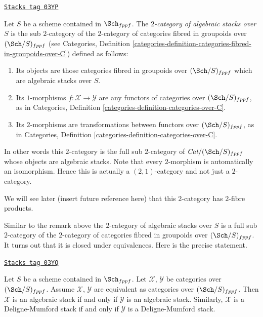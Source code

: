 \begin{definition}
\label{algebraic-definition-morphism-algebraic-stacks}
\href{https://stacks.math.columbia.edu/tag/03YP}{\texttt{Stacks tag 03YP}}

Let $S$ be a scheme contained in $\Sch_{fppf}$.
The {\it $2$-category of algebraic stacks over $S$} is the
sub $2$-category of the $2$-category of categories fibred in
groupoids over $(\Sch/S)_{fppf}$ (see
Categories,
Definition \ref{categories-definition-categories-fibred-in-groupoids-over-C})
defined as follows:
\begin{enumerate}
\item Its objects are those categories fibred in groupoids
over $(\Sch/S)_{fppf}$ which are algebraic stacks over $S$.
\item Its $1$-morphisms $f : \mathcal{X} \to \mathcal{Y}$ are
any functors of categories over $(\Sch/S)_{fppf}$, as in
Categories, Definition \ref{categories-definition-categories-over-C}.
\item Its $2$-morphisms are transformations between functors
over $(\Sch/S)_{fppf}$, as in
Categories, Definition \ref{categories-definition-categories-over-C}.
\end{enumerate}
\end{definition}

In other words this $2$-category is the full sub $2$-category of
$\textit{Cat}/(\Sch/S)_{fppf}$ whose objects are algebraic stacks.
Note that every $2$-morphism is automatically an isomorphism.
Hence this is actually a $(2, 1)$-category and not just a $2$-category.

\medskip\noindent
We will see later (insert future reference here) that this $2$-category
has $2$-fibre products.

\medskip\noindent
Similar to the remark above the $2$-category of algebraic stacks over $S$ is a
full sub $2$-category of the $2$-category of categories fibred in groupoids
over $(\Sch/S)_{fppf}$. It turns out that it is closed under
equivalences. Here is the precise statement.

\begin{lemma}[Equivalent]
\label{algebraic-lemma-equivalent}
\href{https://stacks.math.columbia.edu/tag/03YQ}{\texttt{Stacks tag 03YQ}}

Let $S$ be a scheme contained in $\Sch_{fppf}$.
Let $\mathcal{X}$, $\mathcal{Y}$ be categories over $(\Sch/S)_{fppf}$.
Assume $\mathcal{X}$, $\mathcal{Y}$ are equivalent as categories over
$(\Sch/S)_{fppf}$. Then $\mathcal{X}$ is an algebraic stack if and
only if $\mathcal{Y}$ is an algebraic stack. Similarly, $\mathcal{X}$
is a Deligne-Mumford stack if and only if $\mathcal{Y}$ is a Deligne-Mumford
stack.
\end{lemma}

